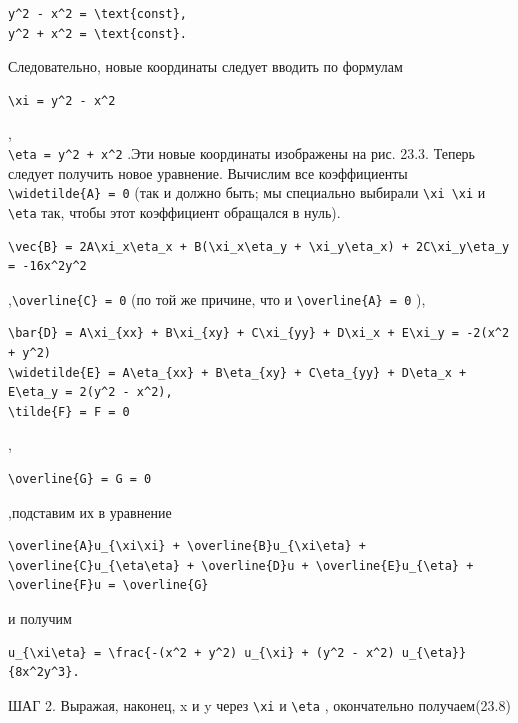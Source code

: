 \documentclass[
  ukrainian,
]{article}
\begin{document}
\begin{verbatim}
y^2 - x^2 = \text{const},
y^2 + x^2 = \text{const}.
\end{verbatim}

Следовательно, новые координаты следует вводить по формулам

\begin{verbatim}
\xi = y^2 - x^2
\end{verbatim}

,\\
\texttt{\textbackslash{}eta\ =\ y\^{}2\ +\ x\^{}2} .Эти новые координаты
изображены на рис. 23.3. Теперь следует получить новое уравнение.
Вычислим все коэффициенты \texttt{\textbackslash{}widetilde\{A\}\ =\ 0}
(так и должно быть; мы специально выбирали
\texttt{\textbackslash{}xi\ \textbackslash{}xi} и
\texttt{\textbackslash{}eta} так, чтобы этот коэффициент обращался в
нуль).

\begin{verbatim}
\vec{B} = 2A\xi_x\eta_x + B(\xi_x\eta_y + \xi_y\eta_x) + 2C\xi_y\eta_y = -16x^2y^2
\end{verbatim}

,\texttt{\textbackslash{}overline\{C\}\ =\ 0} (по той же причине, что и
\texttt{\textbackslash{}overline\{A\}\ =\ 0} ),

\begin{verbatim}
\bar{D} = A\xi_{xx} + B\xi_{xy} + C\xi_{yy} + D\xi_x + E\xi_y = -2(x^2 + y^2)
\widetilde{E} = A\eta_{xx} + B\eta_{xy} + C\eta_{yy} + D\eta_x + E\eta_y = 2(y^2 - x^2),
\tilde{F} = F = 0
\end{verbatim}

,

\begin{verbatim}
\overline{G} = G = 0
\end{verbatim}

,подставим их в уравнение

\begin{verbatim}
\overline{A}u_{\xi\xi} + \overline{B}u_{\xi\eta} + \overline{C}u_{\eta\eta} + \overline{D}u + \overline{E}u_{\eta} + \overline{F}u = \overline{G}
\end{verbatim}

и получим

\begin{verbatim}
u_{\xi\eta} = \frac{-(x^2 + y^2) u_{\xi} + (y^2 - x^2) u_{\eta}}{8x^2y^3}.
\end{verbatim}

ШАГ 2. Выражая, наконец, x и y через \texttt{\textbackslash{}xi} и
\texttt{\textbackslash{}eta} , окончательно получаем(23.8)
\end{document}
